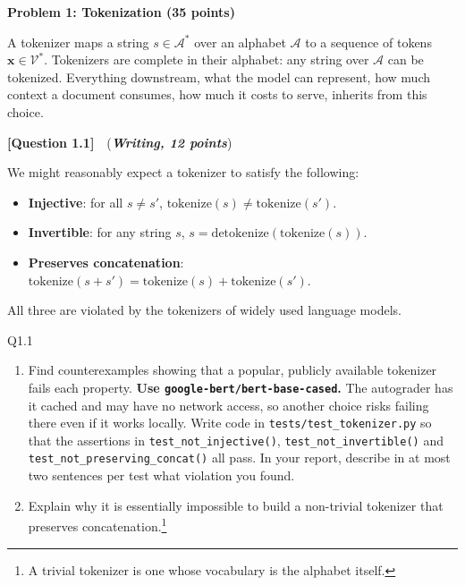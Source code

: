\documentclass[11pt]{article}
\newcommand{\problem}[1]{%
  \vspace{1em}
  \noindent\colorbox{headerblue}{\parbox{\dimexpr\textwidth-2\fboxsep}{%
    \vspace{2pt}\textbf{\large #1}\vspace{2pt}}}
  \vspace{0.6em}
}
\newcommand{\question}[3]{%
  \vspace{0.9em}
  \noindent\textbf{[Question #1]}\ \ (\textit{\textbf{#2, #3 points}})\quad
}
\begin{document}
\problem{Problem 1: Tokenization (35 points)}

\noindent A tokenizer maps a string $s \in \mathcal{A}^*$ over an alphabet $\mathcal{A}$ to a sequence of
tokens $\mathbf{x} \in \mathcal{V}^*$. Tokenizers are complete in their alphabet: any string over
$\mathcal{A}$ can be tokenized. Everything downstream, what the model can represent, how much
context a document consumes, how much it costs to serve, inherits from this choice.

\question{1.1}{Writing}{12}
We might reasonably expect a tokenizer to satisfy the following:

\begin{itemize}[nosep, leftmargin=2em]
  \item \textbf{Injective}: for all $s \neq s'$, $\mathrm{tokenize}(s) \neq \mathrm{tokenize}(s')$.
  \item \textbf{Invertible}: for any string $s$, $s = \mathrm{detokenize}(\mathrm{tokenize}(s))$.
  \item \textbf{Preserves concatenation}: $\mathrm{tokenize}(s + s') = \mathrm{tokenize}(s) + \mathrm{tokenize}(s')$.
\end{itemize}

All three are violated by the tokenizers of widely used language models.

\begin{deliverables}{Q1.1}
\begin{enumerate}[label=\Alph*., leftmargin=1.6em]
  \item Find counterexamples showing that a popular, publicly available tokenizer fails each
    property. \textbf{Use \texttt{google-bert/bert-base-cased}.} The autograder has it
    cached and may have no network access, so another choice risks failing there even if it works
    locally. Write code in \texttt{tests/test\_tokenizer.py} so that the assertions in
    \texttt{test\_not\_injective()}, \texttt{test\_not\_invertible()} and
    \texttt{test\_not\_preserving\_concat()} all pass. In your report, describe in at most two
    sentences per test what violation you found.
  \item Explain why it is essentially impossible to build a non-trivial tokenizer that preserves
    concatenation.\footnote{A trivial tokenizer is one whose vocabulary is the alphabet itself.}
\end{enumerate}
\end{deliverables}
\end{document}
